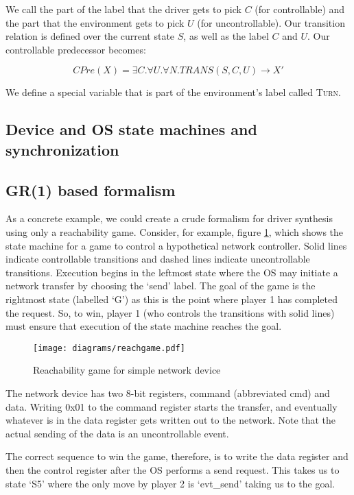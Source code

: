\documentclass[a4paper,twoside,openright,11pt]{book}
\theoremstyle{definition}
\begin{document}
We call the part of the label that the driver gets to pick $C$ (for controllable) and the part that the environment gets to pick $U$ (for uncontrollable). Our transition relation is defined over the current state $S$, as well as the label $C$ and $U$. Our controllable predecessor becomes:

\begin{equation}
    CPre(X) = \exists C. \forall U. \forall N. TRANS(S, C, U) \rightarrow X'
\end{equation}

We define a special variable that is part of the environment's label called \textsc{Turn}.

\subsection{Device and OS state machines and synchronization}

\subsection{GR(1) based formalism}

As a concrete example, we could create a crude formalism for driver synthesis using only a reachability game. Consider, for example, figure \ref{fig:reach}, which shows the state machine for a game to control a hypothetical network controller. Solid lines indicate controllable transitions and dashed lines indicate uncontrollable transitions. Execution begins in the leftmost state where the OS may initiate a network transfer by choosing the `send' label. The goal of the game is the rightmost state (labelled `G') as this is the point where player 1 has completed the request. So, to win, player 1 (who controls the transitions with solid lines) must ensure that execution of the state machine reaches the goal. 

\begin{figure}[t]
\centering
\texttt{[image: diagrams/reachgame.pdf]}
\caption{Reachability game for simple network device}
\label{fig:reach}
\end{figure}

The network device has two 8-bit registers, command (abbreviated cmd) and data. Writing 0x01 to the command register starts the transfer, and eventually whatever is in the data register gets written out to the network. Note that the actual sending of the data is an uncontrollable event. 

The correct sequence to win the game, therefore, is to write the data register and then the control register after the OS performs a send request. This takes us to state `S5' where the only move by player 2 is `evt\_send' taking us to the goal. 
\end{document}
